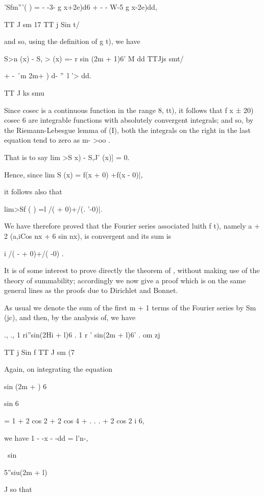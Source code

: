 'Sfm'''( ) = - -3- g x+2e)d6 + - - W-5 g x-2e)dd,

TT J sm 17 TT j Sin t/

and so, using the definition of g t), we have

S>n (x) - S, > (x) =- r sin (2m + 1)6' M dd TTJjs smt/

+ - \'\ m 2m+ ) d- ''~l '> dd.

TT J ks smu

Since cosec is a continuous function in the range 8, tt), it follows
that f x ± 20) cosec 6 are integrable functions with absolutely
convergent integrals; and so, by the Riemann-Lebesgue lemma of
(I), both the integrals on the right in the last equation tend to zero
as m- >oo .

That is to say lim >S x) - S,J' (x)] = 0.

Hence, since lim S (x) = f(x + 0) +f(x - 0)|,

it follows also that

lim>Sf ( ) =l /( + 0)+/(. '-0)|.

We have therefore proved that the Fourier series associated luith f
t), namely a + 2 (a,iCos nx + 6 sin nx), is convergent and its sum is

i /( - + 0)+/( -0) .

It is of some interest to prove directly the theorem of ,
without making use of the theory of summability; accordingly we now
give a proof which is on the same general lines as the proofs due to
Dirichlet and Bonnet.

%
%

As usual we denote the sum of the first m + 1 terms of the Fourier
series by Sm (jc), and then, by the analysis of, we have

., ., 1 ri''sin(2Hi + l)6 . 1 r ' sin(2m + l)6' . om zj

TT j Sin f TT J sm (7

Again, on integrating the equation

sin (2m + ) 6

sin 6

= 1 + 2 cos 2 + 2 cos 4 + . . . + 2 cos 2 i 6,

we have 1 - -x - -dd = l'n-,

\ sin

5''siu(2m + l)

J so that

